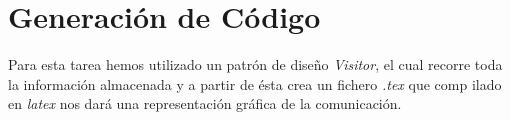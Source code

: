 
\section{Generación de Código}

Para esta tarea hemos utilizado un patrón de diseño \textit{Visitor},
el cual recorre toda la información almacenada y a partir de ésta crea
un fichero \textit{.tex} que comp ilado en \textit{latex} nos dará una
representación gráfica de la comunicación.


